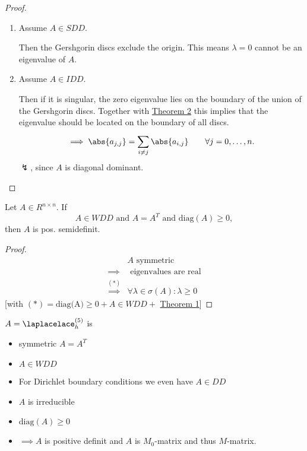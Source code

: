 \begin{proof}
\label{thm:gershgorinboundarycorollary1proof}
	\begin{enumerate}[label=\alph{enumi})]
		\item Assume $A \in SDD$.

			Then the Gershgorin discs exclude the origin. This means $\lambda =0$ cannot be an eigenvalue of $A$.

		\item Assume $A \in IDD$.

			Then if it is singular, the zero eigenvalue lies on the boundary of the union of the Gershgorin discs. Together with \href{thm:gershgorinboundary}{Theorem 2} this implies that the eigenvalue should be located on the boundary of all discs.
			\[
				\implies \abs{a_{j,j}} = \sum_{i \neq j}^{}{\abs{a_{i,j}} } \qquad \forall j=0, \ldots , n
			.\] 
			$\lightning$, since $A$ is diagonal dominant.
	\end{enumerate}
\end{proof}

\begin{korollar}
\label{thm:gershgorinboundarycorollary2}
	Let $A \in R^{n \times  n}$. If 
	\[
		A \in WDD \text{ and } A = A^{T} \text{ and } \text{diag}(A) \geq 0
	,\] 
	then $A$ is pos. semidefinit. 
\end{korollar}

\begin{proof}
\label{thm:gershgorinboundarycorollary2proof}
\begin{align*}
& A \text{ symmetric} \\
	\implies & \text{ eigenvalues are real} \\
	\overset{(\ast)}{\implies} & \forall \lambda  \in \sigma (A) : \lambda  \geq 0
\end{align*}
[with $(\ast) = \text{diag(A)} \geq 0 + A \in WDD + $ \href{thm:gershgorin}{Theorem 1}] 
\end{proof}

\begin{summary}
\label{thm:summarymatrices}
$A = \laplacelace_{h}^{(5)}$ is 
\begin{itemize}
	\item symmetric $A = A^{T}$
	\item $A \in WDD$
	\item For Dirichlet boundary conditions we even have $A \in DD$
	\item $A$ is irreducible
	\item $\text{diag}(A) \geq 0$
	\item $\implies A$ is positive definit and $A$ is $M_0$-matrix and thus $M$-matrix.
\end{itemize}
\end{summary}
